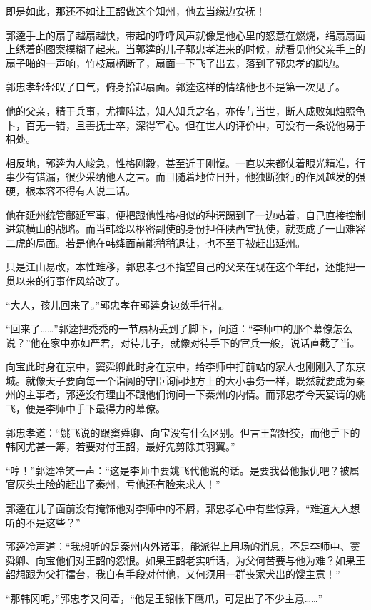 即是如此，那还不如让王韶做这个知州，他去当缘边安抚！

郭逵手上的扇子越扇越快，带起的呼呼风声就像是他心里的怒意在燃烧，绢扇扇面上绣着的图案模糊了起来。当郭逵的儿子郭忠孝进来的时候，就看见他父亲手上的扇子啪的一声响，竹枝扇柄断了，扇面一下飞了出去，落到了郭忠孝的脚边。

郭忠孝轻轻叹了口气，俯身拾起扇面。郭逵这样的情绪他也不是第一次见了。

他的父亲，精于兵事，尤擅阵法，知人知兵之名，亦传与当世，断人成败如烛照龟卜，百无一错，且善抚士卒，深得军心。但在世人的评价中，可没有一条说他易于相处。

相反地，郭逵为人峻急，性格刚毅，甚至近于刚愎。一直以来都仗着眼光精准，行事少有错漏，很少采纳他人之言。而且随着地位日升，他独断独行的作风越发的强硬，根本容不得有人说二话。

他在延州统管鄜延军事，便把跟他性格相似的种谔踢到了一边站着，自己直接控制进筑横山的战略。而当韩绛以枢密副使的身份担任陕西宣抚使，就变成了一山难容二虎的局面。若是他在韩绛面前能稍稍退让，也不至于被赶出延州。

只是江山易改，本性难移，郭忠孝也不指望自己的父亲在现在这个年纪，还能把一贯以来的行事作风给改了。

“大人，孩儿回来了。”郭忠孝在郭逵身边敛手行礼。

“回来了……”郭逵把秃秃的一节扇柄丢到了脚下，问道：“李师中的那个幕僚怎么说？”他在家中亦如严君，对待儿子，就像对待手下的官兵一般，说话直截了当。

向宝此时身在京中，窦舜卿此时身在京中，给李师中打前站的家人也刚刚入了东京城。就像天子要向每一个诣阙的守臣询问地方上的大小事务一样，既然就要成为秦州的主事者，郭逵没有理由不跟他们询问一下秦州的内情。而郭忠孝今天宴请的姚飞，便是李师中手下最得力的幕僚。

郭忠孝道：“姚飞说的跟窦舜卿、向宝没有什么区别。但言王韶奸狡，而他手下的韩冈尤甚一筹，若要对付王韶，最好先剪除其羽翼。”

“哼！”郭逵冷笑一声：“这是李师中要姚飞代他说的话。是要我替他报仇吧？被属官灰头土脸的赶出了秦州，亏他还有脸来求人！”

郭逵在儿子面前没有掩饰他对李师中的不屑，郭忠孝心中有些惊异，“难道大人想听的不是这些？”

郭逵冷声道：“我想听的是秦州内外诸事，能派得上用场的消息，不是李师中、窦舜卿、向宝他们对王韶的怨恨。如果王韶老实听话，为父何苦要与他为难？如果王韶想跟为父打擂台，我自有手段对付他，又何须用一群丧家犬出的馊主意！”

“那韩冈呢，”郭忠孝又问着，“他是王韶帐下鹰爪，可是出了不少主意……”

